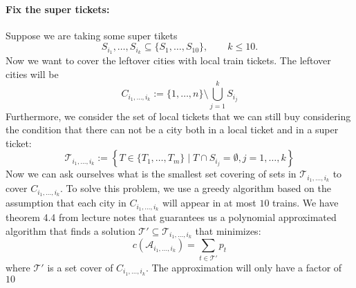 \documentclass[11pt]{article}
\begin{document}
    \paragraph*{Fix the super tickets:} Suppose we are taking some super tikets 
    \begin{equation*}
        S_{i_1}, \dots, S_{i_k} \subseteq \{S_1,\dots,S_{10}\},\qquad k\leq 10. 
    \end{equation*}
    Now we want to cover the leftover cities with local train tickets. The leftover cities will be
    \begin{equation*}
        C_{i_1,\dots, i_k} := \{1,\dots,n\} \setminus \bigcup_{j=1}^kS_{i_j}
    \end{equation*}
    Furthermore, we consider the set of local tickets that we can still buy considering the condition that there can not be a city both in a local ticket and in a super ticket:
    \begin{equation*}
        \mathcal{T}_{i_1,\dots, i_k} := \left\{T\in \{T_1,\dots,T_m\}\mid T\cap S_{i_j} = \emptyset, j=1,\dots,k \right\}
    \end{equation*}
    Now we can ask ourselves what is the smallest set covering of sets in $\mathcal{T}_{i_1,\dots, i_k}$ to cover $C_{i_1,\dots, i_k}$. To solve this problem, we use a greedy algorithm based on the assumption that each city in $C_{i_1,\dots, i_k}$ will appear in at most $10$ trains. We have theorem 4.4 from lecture notes that guarantees us a polynomial approximated algorithm that finds a solution $\mathcal{T}'\subseteq\mathcal{T}_{i_1,\dots, i_k}$ that minimizes:
    \begin{equation*}
        c(\mathcal{A}_{i_1,\dots, i_k}) = \sum_{t\in \mathcal{T}'} p_t
    \end{equation*}
    where $\mathcal{T}'$ is a set cover of $C_{i_1,\dots, i_k}$. The approximation will only have a factor of $10$
\end{document}
